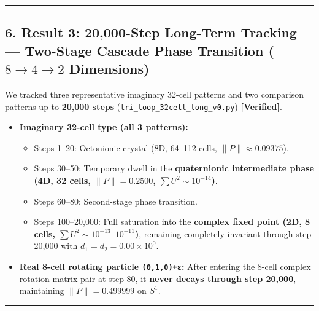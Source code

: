 \documentclass[
  a4paper,
]{article}
\providecommand{\tightlist}{%
  \setlength{\itemsep}{0pt}\setlength{\parskip}{0pt}}
\begin{document}
\begin{center}\rule{0.5\linewidth}{0.5pt}\end{center}

\subsection{\texorpdfstring{6. Result 3: 20,000-Step Long-Term Tracking
--- Two-Stage Cascade Phase Transition (\(8 \to 4 \to 2\)
Dimensions)}{6. Result 3: 20,000-Step Long-Term Tracking --- Two-Stage Cascade Phase Transition (8 \textbackslash to 4 \textbackslash to 2 Dimensions)}}\label{result-3-20000-step-long-term-tracking-two-stage-cascade-phase-transition-8-to-4-to-2-dimensions}

We tracked three representative imaginary 32-cell patterns and two
comparison patterns up to \textbf{20,000 steps}
(\texttt{tri\_\allowbreak{}loop\_\allowbreak{}32cell\_\allowbreak{}long\_\allowbreak{}v0.py}) \textbf{{[}Verified{]}}.

\begin{itemize}
\tightlist
\item
  \textbf{Imaginary 32-cell type (all 3 patterns):}

  \begin{itemize}
  \tightlist
  \item
    Steps 1--20: Octonionic crystal (8D, 64--112 cells,
    \(\|P\| \approx 0.09375\)).
  \item
    Steps 30--50: Temporary dwell in the \textbf{quaternionic
    intermediate phase (4D, 32 cells, \(\|P\| = 0.2500\),
    \(\sum U^2 \sim 10^{-14}\))}.
  \item
    Steps 60--80: Second-stage phase transition.
  \item
    Steps 100--20,000: Full saturation into the \textbf{complex fixed
    point (2D, 8 cells, \(\sum U^2 \sim 10^{-13}\text{–}10^{-11}\))},
    remaining completely invariant through step 20,000 with
    \(d_1 = d_2 = 0.00 \times 10^0\).
  \end{itemize}
\item
  \textbf{Real 8-cell rotating particle \texttt{(0,1,0)+ε}:} After
  entering the 8-cell complex rotation-matrix pair at step 80, it
  \textbf{never decays through step 20,000}, maintaining
  \(\|P\| = 0.499999\) on \(S^1\).
\end{itemize}

\begin{center}\rule{0.5\linewidth}{0.5pt}\end{center}
\end{document}
